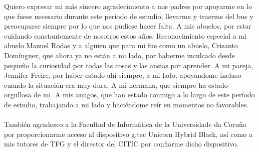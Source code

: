 \documentclass[11pt,a4paper,titlepage,oneside]{report}
\begin{document}

 
 \paxinaenbranco
 \begin{agradecementos}
 Quiero expresar mi más sincero agradecimiento a mis padres por apoyarme en lo que fuese necesario durante este período de estudio, llevarme y traerme del bus y preocuparse siempre por lo que nos pudiese hacer falta.
 A mis abuelos, por estar cuidando constantemente de nosotros estos años.
 Reconocimiento especial a mi abuelo Manuel Rodas y a alguien que para mi fue como un abuelo, Crisanto Domínguez, que ahora ya no están a mi lado, por haberme inculcado desde pequeño la curiosidad por todas las cosas y las ansias por aprender.
 A mi pareja, Jennifer Freire, por haber estado ahí siempre, a mi lado, apoyandome incluso cuando la situación era muy dura.
 A mi hermana, que siempre ha estado orgullosa de mi.
 A mis amigos, que han estado conmigo a lo largo de este período de estudio, trabajando a mi lado y haciéndome reír en momentos no favorables.
 \\\\También agradezco a la Facultad de Informática de la Universidade da Coruña por proporcionarme acceso al dispositivo g.tec Unicorn Hybrid Black, así como a mis tutores de TFG y el director del CITIC por confiarme dicho dispositivo.
 \end{agradecementos}
 

 \setcounter{page}{1}

 \tableofcontents
 \listoffigures
 \listoftables
 \clearpage
 
 \setcounter{page}{1}


 
 
 
 \restoregeometry
 
 \restoregeometry
 
 \restoregeometry
 
 \restoregeometry
\end{document}
